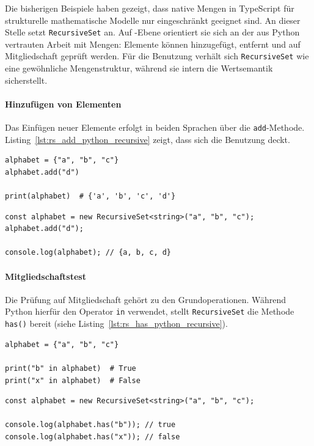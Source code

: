 Die bisherigen Beispiele haben gezeigt, dass native Mengen in TypeScript für strukturelle mathematische Modelle nur eingeschränkt geeignet sind. An dieser Stelle setzt \texttt{RecursiveSet} an. Auf -Ebene orientiert sie sich an der aus Python vertrauten Arbeit mit Mengen: Elemente können hinzugefügt, entfernt und auf Mitgliedschaft geprüft werden. Für die Benutzung verhält sich \texttt{RecursiveSet} wie eine gewöhnliche Mengenstruktur, während sie intern die Wertsemantik sicherstellt.

\paragraph{Hinzufügen von Elementen}
Das Einfügen neuer Elemente erfolgt in beiden Sprachen über die \texttt{add}-Methode. Listing~\ref{lst:rs_add_python_recursive} zeigt, dass sich die Benutzung deckt.

\begin{listing}[ht]
    \caption{Hinzufügen von Elementen in Python und mit \texttt{RecursiveSet}}
    \label{lst:rs_add_python_recursive}
    \begin{verbatim}
alphabet = {"a", "b", "c"}
alphabet.add("d")

print(alphabet)  # {'a', 'b', 'c', 'd'}
    \end{verbatim}
    
    
    
    \begin{verbatim}
const alphabet = new RecursiveSet<string>("a", "b", "c");
alphabet.add("d");

console.log(alphabet); // {a, b, c, d}
    \end{verbatim}
\end{listing}

\paragraph{Mitgliedschaftstest}
Die Prüfung auf Mitgliedschaft gehört zu den Grundoperationen. Während Python hierfür den Operator \texttt{in} verwendet, stellt \texttt{RecursiveSet} die Methode \texttt{has()} bereit (siehe Listing~\ref{lst:rs_has_python_recursive}).

\begin{listing}[ht]
    \caption{Mitgliedschaftstest in Python und mit \texttt{RecursiveSet}}
    \label{lst:rs_has_python_recursive}
    \begin{verbatim}
alphabet = {"a", "b", "c"}

print("b" in alphabet)  # True
print("x" in alphabet)  # False
    \end{verbatim}
    
    
    
    \begin{verbatim}
const alphabet = new RecursiveSet<string>("a", "b", "c");

console.log(alphabet.has("b")); // true
console.log(alphabet.has("x")); // false
    \end{verbatim}
\end{listing}

